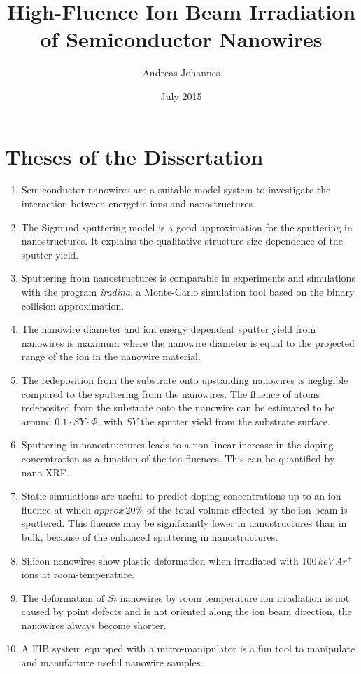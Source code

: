 \titlehead{Friedrich Schiller Universität Jena\\
PAF}
\subject{Dissertation}
\title{High-Fluence Ion Beam Irradiation of Semiconductor Nanowires}
\author{Andreas Johannes}
\date{July 2015}
\maketitle


\vspace*{-4cm}\section*{Theses of the Dissertation}

\setcounter{page}{1}


\begin{enumerate}
\item{Semiconductor nanowires are a suitable model system to investigate the interaction between energetic ions and nanostructures.}
\item{The Sigmund sputtering model is a good approximation for the sputtering in nanostructures. It explains the qualitative structure-size dependence of the sputter yield.}
\item{Sputtering from nanostructures is comparable in experiments and simulations with the program \emph{iradina}, a Monte-Carlo simulation tool based on the binary collision approximation.}
\item{The nanowire diameter and ion energy dependent sputter yield from nanowires is maximum where the nanowire diameter is equal to the projected range of the ion in the nanowire material.}
\item{The redeposition from the substrate onto upstanding nanowires is negligible compared to the sputtering from the nanowires. The fluence of atoms redeposited from the substrate onto the nanowire can be estimated to be around $0.1\cdot SY \cdot \Phi$, with $SY$ the sputter yield from the substrate surface.}
\item{Sputtering in nanostructures leads to a non-linear increase in the doping concentration as a function of the ion fluences. This can be quantified by nano-XRF.}
\item{Static simulations are useful to predict doping concentrations up to an ion fluence at which $approx\,20\%$ of the total volume effected by the ion beam is sputtered. This fluence may be significantly lower in nanostructures than in bulk, because of the enhanced sputtering in nanostructures.}
\item{Silicon nanowires show plastic deformation when irradiated with $100\,keV\,Ar^+$ ions at room-temperature.} 
\item{The deformation of $Si$ nanowires by room temperature ion irradiation is not caused by point defects and is not oriented along the ion beam direction, the nanowires always become shorter.}
\item{A FIB system equipped with a micro-manipulator is a fun tool to manipulate and manufacture useful nanowire samples.}

\end{enumerate}

